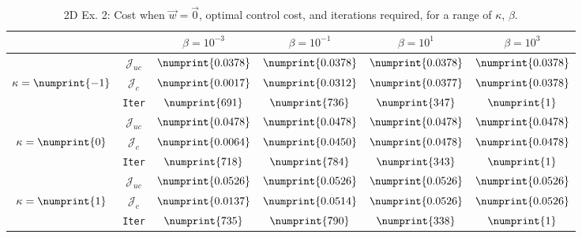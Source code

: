 \begin{table}
\begin{tabular}{ | c | c || c | c | c | c ||}
\hline
\multicolumn{2}{|c||}{}& $\beta = 10^{-3}$ & $\beta = 10^{-1}$ & $\beta = 10^{1}$ & $\beta = 10^{3}$  \\
\hline
\hline
 & $\mathcal{J}_{uc}$ & $\numprint{0.0378}$ & $\numprint{0.0378}$ & $\numprint{0.0378}$ & $\numprint{0.0378}$ \\
$\kappa= \numprint{-1}$  & $\mathcal{J}_c$ & $\numprint{0.0017}$ & $\numprint{0.0312}$ & $\numprint{0.0377}$ & $\numprint{0.0378}$ \\
& \texttt{Iter} & $\numprint{691}$ & $\numprint{736}$ & $\numprint{347}$ & $\numprint{1}$ \\
\hline
 & $\mathcal{J}_{uc}$ & $\numprint{0.0478}$ & $\numprint{0.0478}$ & $\numprint{0.0478}$ & $\numprint{0.0478}$ \\
$\kappa= \numprint{0}$  & $\mathcal{J}_c$ & $\numprint{0.0064}$ & $\numprint{0.0450}$ & $\numprint{0.0478}$ & $\numprint{0.0478}$ \\
& \texttt{Iter} & $\numprint{718}$ & $\numprint{784}$ & $\numprint{343}$ & $\numprint{1}$ \\
\hline
 & $\mathcal{J}_{uc}$ & $\numprint{0.0526}$ & $\numprint{0.0526}$ & $\numprint{0.0526}$ & $\numprint{0.0526}$ \\
$\kappa= \numprint{1}$  & $\mathcal{J}_c$ & $\numprint{0.0137}$ & $\numprint{0.0514}$ & $\numprint{0.0526}$ & $\numprint{0.0526}$ \\
& \texttt{Iter} & $\numprint{735}$ & $\numprint{790}$ & $\numprint{338}$ & $\numprint{1}$ \\
\hline
\end{tabular}
\caption{2D Ex. 2: Cost when $\vec{w}=\vec{0}$, optimal control cost, and iterations required, for a range of $\kappa$, $\beta$.}
\label{TabS5:Prob22D}
\end{table}